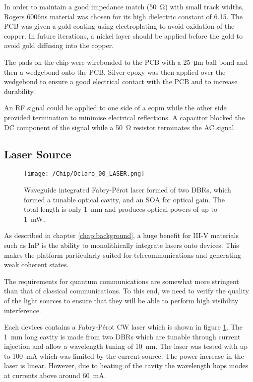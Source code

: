 In order to maintain a good impedance match (\SI{50}{\ohm}) with small track widths, Rogers 6006ns material was chosen for its high dielectric constant of \num{6.15}. The PCB was given a gold coating using electroplating to avoid oxidation of the copper. In future iterations, a nickel layer should be applied before the gold to avoid gold diffusing into the copper. 

The pads on the chip were wirebonded to the PCB with a \SI{25}{\micro\meter} ball bond and then a wedgebond onto the PCB. Silver epoxy was then applied over the wedgebond to ensure a good electrical contact with the PCB and to increase durability. 

An RF signal could be applied to one side of a \ac{eopm} while the other side provided termination to minimise electrical reflections. A capacitor blocked the DC component of the signal while a \SI{50}{\ohm} resistor terminates the AC signal. 

\subsection{Laser Source}

\begin{figure}[tp]
	\centering
	\texttt{[image: /Chip/Oclaro\_00\_LASER.png]}
	\caption[Microscope image of the waveguide integrated Fabry-P\'{e}rot laser]{Waveguide integrated Fabry-P\'{e}rot laser formed of two \acp{DBR}, which formed a tunable optical cavity, and an \ac{SOA} for optical gain. The total length is only \SI{1}{\mm} and produces optical powers of up to \SI{1}{\milli\watt}.}
	\label{fig:InP_laser}
\end{figure}

As described in chapter \ref{chap:background}, a huge benefit for III-V materials such as \ac{InP} is the ability to monolithically integrate lasers onto devices. This makes the platform particularly suited for telecommunications and generating weak coherent states. 

The requirements for quantum communications are somewhat more stringent than that of classical communications. To this end, we need to verify the quality of the light sources to ensure that they will be able to perform high visibility interference. 

Each devices contains a Fabry-P\'{e}rot \ac{CW} laser which is shown in figure \ref{fig:InP_laser}. The \SI{1}{mm} long cavity is made from two \acp{DBR} which are tunable through current injection and allow a wavelength tuning of \SI{10}{nm}. The laser was tested with up to \SI{100}{\mA} which was limited by the current source. The power increase in the laser is linear. However, due to heating of the cavity the wavelength hops modes at currents above around \SI{60}{\mA}.

